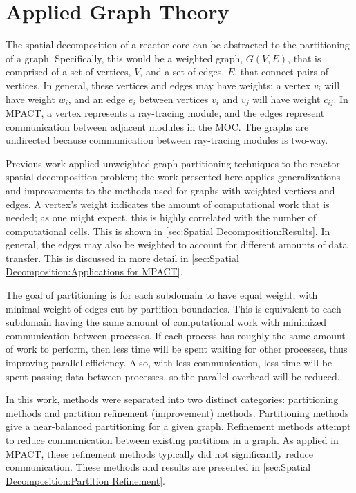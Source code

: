 {  \section{Applied Graph Theory}{\label{sec:Spatial Decomposition:Applied Graph Theory}
    The spatial decomposition of a reactor core can be abstracted to the partitioning of a graph.
    Specifically, this would be a weighted graph, $G(V,E)$, that is comprised of a set of vertices, $V$, and a set of edges, $E$, that connect pairs of vertices.
    In general, these vertices and edges may have weights; a vertex $v_i$ will have weight $w_i$, and an edge $e_i$ between vertices $v_i$ and $v_j$ will have weight $c_{ij}$.
    In MPACT, a vertex represents a ray-tracing module, and the edges represent communication between adjacent modules in the \ac{MOC}.
    The graphs are undirected because communication between ray-tracing modules is two-way.

    Previous work \cite{Fitzgerald2017} applied unweighted graph partitioning techniques to the reactor spatial decomposition problem; the work presented here applies generalizations and improvements to the methods used for graphs with weighted vertices and edges.
    A vertex's weight indicates the amount of computational work that is needed; as one might expect, this is highly correlated with the number of computational cells.
    This is shown in \cref{sec:Spatial Decomposition:Results}.
    In general, the edges may also be weighted to account for different amounts of data transfer.
    This is discussed in more detail in \cref{sec:Spatial Decomposition:Applications for MPACT}.

    The goal of partitioning is for each subdomain to have equal weight, with minimal weight of edges cut by partition boundaries.
    This is equivalent to each subdomain having the same amount of computational work with minimized communication between processes.
    If each process has roughly the same amount of work to perform, then less time will be spent waiting for other processes, thus improving parallel efficiency.
    Also, with less communication, less time will be spent passing data between processes, so the parallel overhead will be reduced.

    In this work, methods were separated into two distinct categories: partitioning methods and partition refinement (improvement) methods.
    Partitioning methods give a near-balanced partitioning for a given graph.
    Refinement methods attempt to reduce communication between existing partitions in a graph.
    As applied in MPACT, these refinement methods typically did not significantly reduce communication.
    These methods and results are presented in \cref{sec:Spatial Decomposition:Partition Refinement}.
}}
